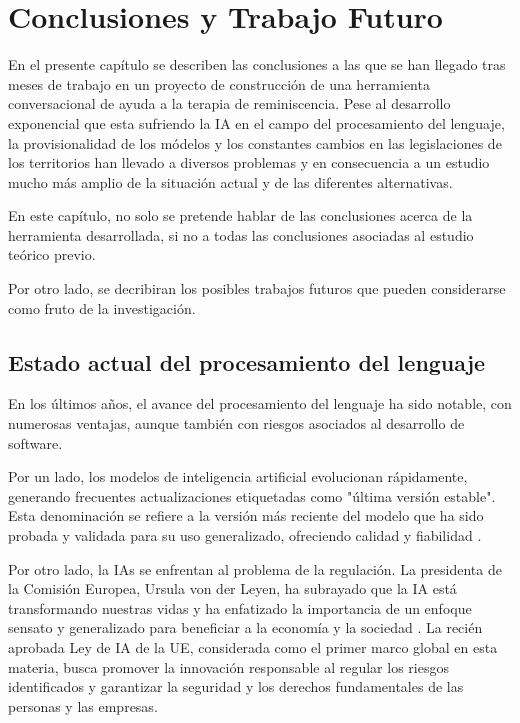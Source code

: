 \chapter{Conclusiones y Trabajo Futuro}
\label{cap:conclusiones}
En el presente capítulo se describen las conclusiones a las que se han llegado tras meses de trabajo en un proyecto de construcción de una herramienta conversacional de ayuda a la terapia de reminiscencia. Pese al desarrollo exponencial que esta sufriendo la IA en el campo del procesamiento del lenguaje, la provisionalidad de los módelos y los constantes cambios en las legislaciones de los territorios han llevado a diversos problemas y en consecuencia a un estudio mucho más amplio de la situación actual y de las diferentes alternativas. 

En este capítulo, no solo se pretende hablar de las conclusiones acerca de la herramienta desarrollada, si no a todas las conclusiones asociadas al estudio teórico previo. 

Por otro lado, se decribiran los posibles trabajos futuros que pueden considerarse como fruto de la investigación.

\section{Estado actual del procesamiento del lenguaje}
En los últimos años, el avance del procesamiento del lenguaje ha sido notable, con numerosas ventajas, aunque también con riesgos asociados al desarrollo de software.

Por un lado, los modelos de inteligencia artificial evolucionan rápidamente, generando frecuentes actualizaciones etiquetadas como "última versión estable". Esta denominación se refiere a la versión más reciente del modelo que ha sido probada y validada para su uso generalizado, ofreciendo calidad y fiabilidad \cite{generative-ai-terms}.

Por otro lado, la IAs se enfrentan al problema de la regulación. La presidenta de la Comisión Europea, Ursula von der Leyen, ha subrayado que la IA está transformando nuestras vidas y ha enfatizado la importancia de un enfoque sensato y generalizado para beneficiar a la economía y la sociedad \cite{ComisionEuropea-ComunicadoPrensa-LeyIA}. La recién aprobada Ley de IA de la UE, considerada como el primer marco global en esta materia, busca promover la innovación responsable al regular los riesgos identificados y garantizar la seguridad y los derechos fundamentales de las personas y las empresas.

